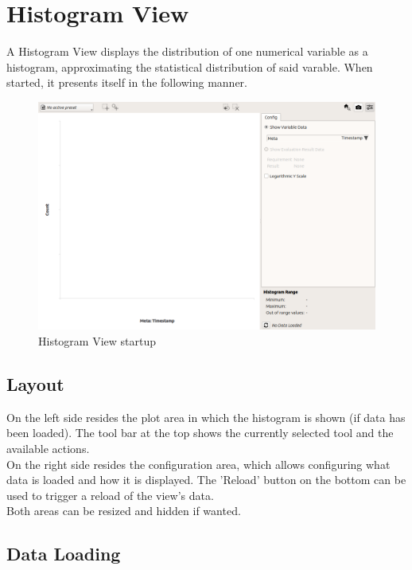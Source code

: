 \chapter{Histogram View}
\label{sec:histo_view}

A Histogram View displays the distribution of one numerical variable as a histogram, approximating the statistical distribution of said varable. When started, it presents itself in the following manner.

\begin{figure}[H]
    \hspace*{-2cm}
    \includegraphics[width=18cm,frame]{figures/histogram_start.png}
  \caption{Histogram View startup}
\end{figure}

\section{Layout}

On the left side resides the plot area in which the histogram is shown (if data has been loaded). 
The tool bar at the top shows the currently selected tool and the available actions.\\

On the right side resides the configuration area, which allows configuring what data is loaded and how it is displayed.
The 'Reload' button on the bottom can be used to trigger a reload of the view's data.\\

Both areas can be resized and hidden if wanted.

\section{Data Loading}

